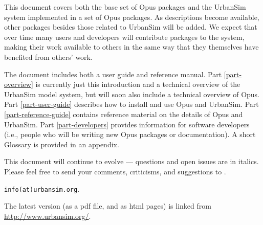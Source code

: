 
This document covers both the base set of Opus packages and the UrbanSim
system implemented in a set of Opus packages.  As descriptions
become available, other packages besides those related to UrbanSim will be
added.  We expect that over time many users and developers will contribute
packages to the system, making their work available to others in the same
way that they themselves have benefited from others' work.

The document includes both a user guide and reference manual.  Part
\ref{part-overview} is currently just this introduction and a
technical overview of the UrbanSim model system, but will soon also
include a technical overview of Opus. Part \ref{part-user-guide}
describes how to install and use Opus and UrbanSim.  Part
\ref{part-reference-guide} contains reference material on the
details of Opus and UrbanSim. Part \ref{part-developers} provides
information for software developers (i.e., people who will be
writing new Opus packages or documentation).  A short Glossary is
provided in an appendix.

This document will continue to evolve --- questions and open issues are in
italics.  Please feel free to send your comments, criticisms, and
suggestions to
. 
\begin{htmlonly}
{\tt info(at)urbansim.org}. 
\end{htmlonly}

The latest version (as a pdf file, and as html pages) is linked from
\url{http://www.urbansim.org/}.

